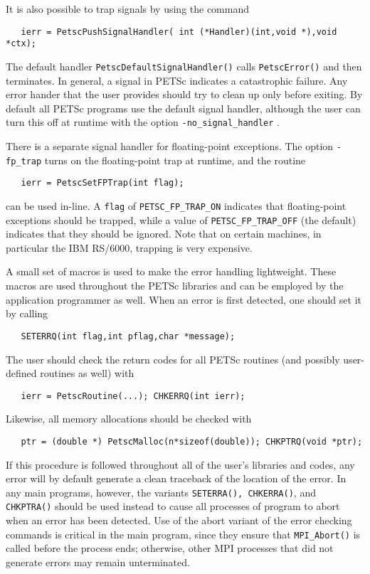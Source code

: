 It is also possible to trap signals by using the 
command 
\begin{verbatim}
   ierr = PetscPushSignalHandler( int (*Handler)(int,void *),void *ctx);
\end{verbatim}
The default handler {\tt PetscDefaultSignalHandler()} 
calls  
{\tt PetscError()} and then terminates. In general, a signal in PETSc
indicates a catastrophic failure.  Any error hander that the user provides
should try to clean up only before exiting.  By default all PETSc programs
use the default signal handler, although the user can turn this off 
at runtime with the 
option {\tt -no\_signal\_handler} .

There is a separate signal handler for floating-point exceptions.
  
The option {\tt -fp\_trap} turns on the floating-point trap at runtime,
and the routine   
\begin{verbatim}
   ierr = PetscSetFPTrap(int flag);
\end{verbatim}
can be used in-line.
A {\tt flag} of {\tt PETSC\_FP\_TRAP\_ON} 
indicates that floating-point exceptions should be trapped,
while a value of {\tt PETSC\_FP\_TRAP\_OFF} (the default) indicates that they 
should be ignored.  Note that on certain machines, in particular 
the IBM RS/6000, trapping is very expensive.

A small set of macros is used to make the error handling lightweight.
These macros are used throughout the PETSc libraries and can be employed
by the application    
programmer as well.  When an error is first detected, 
one should set it by calling
\begin{verbatim}
   SETERRQ(int flag,int pflag,char *message);
\end{verbatim}
The user should check the return codes for all PETSc routines (and
possibly user-defined routines as well) with 
\begin{verbatim}
   ierr = PetscRoutine(...); CHKERRQ(int ierr);
\end{verbatim}
Likewise, all memory allocations should be checked with 
\begin{verbatim}
   ptr = (double *) PetscMalloc(n*sizeof(double)); CHKPTRQ(void *ptr);
\end{verbatim}
If this procedure is followed throughout all of the user's libraries 
and codes, any error will by default generate a clean traceback of 
the location   
of the error.  In any main programs, however, the variants
{\tt SETERRA(), CHKERRA()}, and {\tt CHKPTRA()} should be used instead 
to cause all processes of program to abort when an error has been detected. 
Use of the abort variant of the error checking commands is critical
in the main program, since they ensure that {\tt MPI\_Abort()} is called 
before the process ends; otherwise, other MPI processes that 
did not generate errors may remain unterminated.

